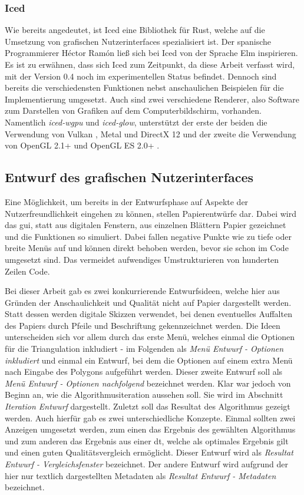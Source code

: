 \subsubsection{Iced}
Wie bereits angedeutet, ist Iced eine Bibliothek für Rust, welche auf die Umsetzung von grafischen Nutzerinterfaces spezialisiert ist.
Der spanische Programmierer Héctor Ramón ließ sich bei Iced von der Sprache Elm inspirieren. Es ist zu erwähnen, dass sich Iced zum Zeitpunkt, da diese Arbeit verfasst wird, mit der Version 
0.4 noch im experimentellen Status befindet. Dennoch sind bereits die verschiedensten Funktionen nebst anschaulichen Beispielen für die Implementierung umgesetzt. Auch sind zwei verschiedene 
Renderer, also Software zum Darstellen von Grafiken auf dem Computerbildschirm, vorhanden. Namentlich \emph{iced-wgpu} und \emph{iced-glow}, unterstützt der erste der beiden die Verwendung von 
Vulkan \cite{vulkan}, Metal \cite{metal} und DirectX 12 \cite{dx12} und der zweite die Verwendung von OpenGL 2.1+ \cite{opgl} und OpenGL ES 2.0+ \cite{opgles}. \cite{iced}

\subsection{Entwurf des grafischen Nutzerinterfaces}
Eine Möglichkeit, um bereits in der Entwurfsphase auf Aspekte der Nutzerfreundlichkeit eingehen zu können, 
stellen Papierentwürfe dar. Dabei wird das \ac{gui}, statt aus digitalen Fenstern, aus einzelnen Blättern Papier gezeichnet und die Funktionen so simuliert. Dabei fallen negative Punkte wie zu tiefe oder breite 
Menüs auf und können direkt behoben werden, bevor sie schon im Code umgesetzt sind. Das vermeidet aufwendiges Umstrukturieren von hunderten Zeilen Code.

Bei dieser Arbeit gab es zwei konkurrierende Entwurfsideen, welche hier aus Gründen der Anschaulichkeit und Qualität nicht auf Papier dargestellt werden. Statt dessen werden digitale Skizzen verwendet, bei denen eventuelles Auffalten des Papiers
durch Pfeile und Beschriftung gekennzeichnet werden. 
Die Ideen unterscheiden sich vor allem durch das erste Menü, welches einmal die Optionen für die Triangulation inkludiert - im Folgenden als \emph{Menü Entwurf - Optionen inkludiert} und einmal ein Entwurf, bei dem 
die Optionen auf einem extra Menü nach Eingabe des Polygons aufgeführt werden. Dieser zweite Entwurf soll als \emph{Menü Entwurf - Optionen nachfolgend} bezeichnet werden.
Klar war jedoch von Beginn an, wie die Algorithmusiteration aussehen soll. Sie wird im Abschnitt \emph{Iteration Entwurf} dargestellt.
Zuletzt soll das Resultat des Algorithmus gezeigt werden. Auch hierfür gab es zwei unterschiedliche Konzepte. Einmal sollten zwei Anzeigen umgesetzt werden, zum einen das Ergebnis des gewählten Algorithmus und zum anderen das 
Ergebnis aus einer \ac{dt}, welche als optimales Ergebnis gilt und einen guten Qualitätsvergleich ermöglicht. Dieser Entwurf wird als \emph{Resultat Entwurf - Vergleichsfenster} bezeichnet.
Der andere Entwurf wird aufgrund der hier nur textlich dargestellten Metadaten als \emph{Resultat Entwurf - Metadaten} bezeichnet.



